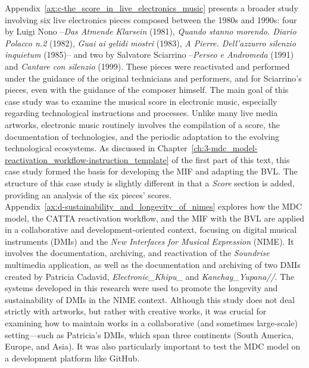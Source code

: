 Appendix~\ref{ax:c-the_score_in_live_electronics_music} presents a broader study involving six live electronics pieces composed between the 1980s and 1990s: four by Luigi Nono –\textit{Das Atmende Klarsein} (1981), \textit{Quando stanno morendo. Diario Polacco n.2} (1982), \textit{Guai ai gelidi mostri} (1983), \textit{A Pierre. Dell’azzurro silenzio inquietum} (1985)– and two by Salvatore Sciarrino –\textit{Perseo e Andromeda} (1991) and \textit{Cantare con silenzio} (1999). These pieces were reactivated and performed under the guidance of the original technicians and performers, and for Sciarrino’s pieces, even with the guidance of the composer himself. The main goal of this case study was to examine the musical score in electronic music, especially regarding technological instructions and processes. Unlike many live media artworks, electronic music routinely involves the compilation of a score, the documentation of technologies, and the periodic adaptation to the evolving technological ecosystems. As discussed in Chapter~\ref{ch:3-mdc_model-reactivation_workflow-instruction_template} of the first part of this text, this case study formed the basis for developing the MIF and adapting the BVL. The structure of this case study is slightly different in that a \textit{Score} section is added, providing an analysis of the six pieces’ scores.\\
Appendix~\ref{ax:d-sustainability_and_longevity_of_nimes} explores how the MDC model, the CATTA reactivation workflow, and the MIF with the BVL are applied in a collaborative and development-oriented context, focusing on digital musical instruments (DMIs) and the \textit{New Interfaces for Musical Expression} (NIME). It involves the documentation, archiving, and reactivation of the \textit{Soundrise} multimedia application, as well as the documentation and archiving of two DMIs created by Patricia Cadavid, \textit{Electronic\_Khipu\_} and \textit{Kanchay\_Yupana//}. The systems developed in this research were used to promote the longevity and sustainability of DMIs in the NIME context. Although this study does not deal strictly with artworks, but rather with creative works, it was crucial for examining how to maintain works in a collaborative (and sometimes large-scale) setting—such as Patricia’s DMIs, which span three continents (South America, Europe, and Asia). It was also particularly important to test the MDC model on a development platform like GitHub.
